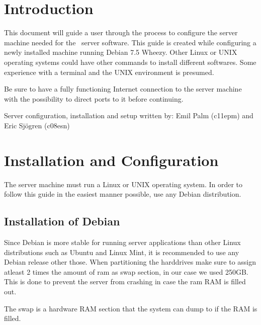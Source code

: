 \label{chap:exp_app_debian}
\section{Introduction}
This document will guide a user through the process to configure the server machine needed for the \appName\ server software. This guide is created while configuring a newly installed machine running Debian 7.5 Wheezy. Other Linux or UNIX operating systems could have other commands to install different softwares. Some experience with a terminal and the UNIX environment is presumed.

Be sure to have a fully functioning Internet connection to the server machine with the possibility to direct ports to it before continuing.

Server configuration, installation and setup written by: Emil Palm (c11epm) and Eric Sjögren (c08esn)

\section{Installation and Configuration}
The server machine must run a Linux or UNIX operating system. In order to follow this guide in the easiest manner 
possible, use any Debian distribution. 


\subsection{Installation of Debian}
Since Debian is more stable for running server applications than other Linux distributions such as Ubuntu and Linux Mint, it is recommended to use any Debian release other those.
When partitioning the harddrives make sure to assign atleast 2 times the amount of ram as swap section, in our case we used 250GB. This is done to prevent the server from crashing in case the ram RAM is filled out.

The swap is a hardware RAM section that the system can dump to if the RAM is filled.

